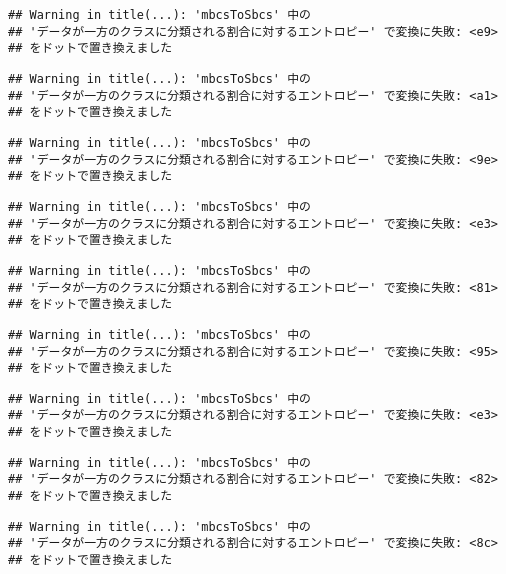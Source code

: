 \documentclass[
]{article}
\begin{document}
\begin{verbatim}
## Warning in title(...): 'mbcsToSbcs' 中の
## 'データが一方のクラスに分類される割合に対するエントロピー' で変換に失敗: <e9>
## をドットで置き換えました
\end{verbatim}

\begin{verbatim}
## Warning in title(...): 'mbcsToSbcs' 中の
## 'データが一方のクラスに分類される割合に対するエントロピー' で変換に失敗: <a1>
## をドットで置き換えました
\end{verbatim}

\begin{verbatim}
## Warning in title(...): 'mbcsToSbcs' 中の
## 'データが一方のクラスに分類される割合に対するエントロピー' で変換に失敗: <9e>
## をドットで置き換えました
\end{verbatim}

\begin{verbatim}
## Warning in title(...): 'mbcsToSbcs' 中の
## 'データが一方のクラスに分類される割合に対するエントロピー' で変換に失敗: <e3>
## をドットで置き換えました
\end{verbatim}

\begin{verbatim}
## Warning in title(...): 'mbcsToSbcs' 中の
## 'データが一方のクラスに分類される割合に対するエントロピー' で変換に失敗: <81>
## をドットで置き換えました
\end{verbatim}

\begin{verbatim}
## Warning in title(...): 'mbcsToSbcs' 中の
## 'データが一方のクラスに分類される割合に対するエントロピー' で変換に失敗: <95>
## をドットで置き換えました
\end{verbatim}

\begin{verbatim}
## Warning in title(...): 'mbcsToSbcs' 中の
## 'データが一方のクラスに分類される割合に対するエントロピー' で変換に失敗: <e3>
## をドットで置き換えました
\end{verbatim}

\begin{verbatim}
## Warning in title(...): 'mbcsToSbcs' 中の
## 'データが一方のクラスに分類される割合に対するエントロピー' で変換に失敗: <82>
## をドットで置き換えました
\end{verbatim}

\begin{verbatim}
## Warning in title(...): 'mbcsToSbcs' 中の
## 'データが一方のクラスに分類される割合に対するエントロピー' で変換に失敗: <8c>
## をドットで置き換えました
\end{verbatim}
\end{document}
